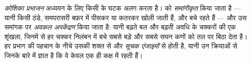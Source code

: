\begin{definition}[कोशिका प्रभाजन]\label{def:b1:cell-unit-of-life:fractionation}
\emph{कोशिका प्रभाजन} अध्ययन के लिए किसी  के
घटक अलग करता है।  को \emph{समांगीकृत} किया जाता है ---
यानी  किसी ठंडे, समपरासरी बफ़र में पीसकर या कतरकर खोली जाती हैं,
और  बचे रहते हैं --- और उस समांगक पर \emph{अवकल
अपकेंद्रण} किया जाता है: यानी बढ़ते बल और बढ़ती
अवधि के चक्करों की एक शृंखला, जिनमें से हर चक्कर निलंबन में बचे सबसे बड़े
और सबसे सघन कणों को तल पर बिठा देता है। हर प्रभाग की पहचान  के नीचे उसकी शक्ल से और \emph{सूचक एंजाइमों}
से होती है, यानी उन क्रियाओं से जिनके बारे में ज्ञात है कि वे केवल एक ही
कक्ष में रहती हैं।
\end{definition}

